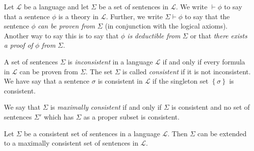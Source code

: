 \documentclass[../../main.tex]{subfiles}
\begin{document}
\begin{definition}[Proof]\cite[p.25]{Cha90}
    Let $\mathcal{L}$ be a language and let $\Sigma$ be a set of sentences in $\mathcal{L}$.
    We write $\vdash \phi$ to say that a sentence $\phi$ is a theory in $\mathcal{L}$.
    Further, we write $\Sigma \vdash \phi$ to say that the sentence $\phi$ \textit{can be proven from} $\Sigma$ (in conjunction with the logical axioms).
    Another way to say this is to say that $\phi$ \textit{is deductible from} $\Sigma$ or that \textit{there exists a proof of} $\phi$ \textit{from} $\Sigma$.
\end{definition}

\begin{definition}[Consistency]\cite[p.25]{Cha90}
    A set of sentences $\Sigma$ is \textit{inconsistent} in a language $\mathcal{L}$ if and only if every formula in $\mathcal{L}$ can be proven from $\Sigma$.
    The set $\Sigma$ is called \textit{consistent} if it is not inconsistent.
    We have say that a sentence $\sigma$ is consistent in $\mathcal{L}$ if the singleton set $\left\{\sigma\right\}$ is consistent.

    We say that $\Sigma$ is \textit{maximally consistent} if and only if $\Sigma$ is consistent 
    and no set of sentences $\Sigma'$ which has $\Sigma$ as a proper subset is consistent.
\end{definition}

\begin{theorem}\cite[Proposition 1.3.11]{Cha90}
    Let $\Sigma$ be a consistent set of sentences in a language $\mathcal{L}$.
    Then $\Sigma$ can be extended to a maximally consistent set of sentences in $\mathcal{L}$.
\end{theorem}
\end{document}
